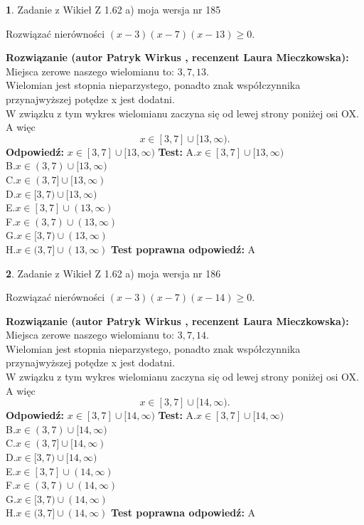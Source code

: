 \documentclass[12pt, a4paper]{article}
\theoremstyle{definition} %
\newtheorem{zad}{}
\newcommand{\zadStart}[1]{\begin{zad}#1\newline}
\newcommand{\zadStop}{\end{zad}}
\newcommand{\rozwStart}[2]{\noindent \textbf{Rozwiązanie (autor #1 , recenzent #2): }\newline}
\newcommand{\rozwStop}{\newline}
\newcommand{\odpStart}{\noindent \textbf{Odpowiedź:}\newline}
\newcommand{\odpStop}{\newline}
\newcommand{\testStart}{\noindent \textbf{Test:}\newline}
\newcommand{\testStop}{\newline}
\newcommand{\kluczStart}{\noindent \textbf{Test poprawna odpowiedź:}\newline}
\newcommand{\kluczStop}{\newline}
\begin{document}
\zadStart{Zadanie z Wikieł Z 1.62 a) moja wersja nr 185}

Rozwiązać nierówności $(x-3)(x-7)(x-13)\ge0$.
\zadStop
\rozwStart{Patryk Wirkus}{Laura Mieczkowska}
Miejsca zerowe naszego wielomianu to: $3, 7, 13$.\\
Wielomian jest stopnia nieparzystego, ponadto znak współczynnika przy\linebreak najwyższej potędze x jest dodatni.\\ W związku z tym wykres wielomianu zaczyna się od lewej strony poniżej osi OX. A więc $$x \in [3,7] \cup [13,\infty).$$
\rozwStop
\odpStart
$x \in [3,7] \cup [13,\infty)$
\odpStop
\testStart
A.$x \in [3,7] \cup [13,\infty)$\\
B.$x \in (3,7) \cup [13,\infty)$\\
C.$x \in (3,7] \cup [13,\infty)$\\
D.$x \in [3,7) \cup [13,\infty)$\\
E.$x \in [3,7] \cup (13,\infty)$\\
F.$x \in (3,7) \cup (13,\infty)$\\
G.$x \in [3,7) \cup (13,\infty)$\\
H.$x \in (3,7] \cup (13,\infty)$
\testStop
\kluczStart
A
\kluczStop



\zadStart{Zadanie z Wikieł Z 1.62 a) moja wersja nr 186}

Rozwiązać nierówności $(x-3)(x-7)(x-14)\ge0$.
\zadStop
\rozwStart{Patryk Wirkus}{Laura Mieczkowska}
Miejsca zerowe naszego wielomianu to: $3, 7, 14$.\\
Wielomian jest stopnia nieparzystego, ponadto znak współczynnika przy\linebreak najwyższej potędze x jest dodatni.\\ W związku z tym wykres wielomianu zaczyna się od lewej strony poniżej osi OX. A więc $$x \in [3,7] \cup [14,\infty).$$
\rozwStop
\odpStart
$x \in [3,7] \cup [14,\infty)$
\odpStop
\testStart
A.$x \in [3,7] \cup [14,\infty)$\\
B.$x \in (3,7) \cup [14,\infty)$\\
C.$x \in (3,7] \cup [14,\infty)$\\
D.$x \in [3,7) \cup [14,\infty)$\\
E.$x \in [3,7] \cup (14,\infty)$\\
F.$x \in (3,7) \cup (14,\infty)$\\
G.$x \in [3,7) \cup (14,\infty)$\\
H.$x \in (3,7] \cup (14,\infty)$
\testStop
\kluczStart
A
\kluczStop
\end{document}
